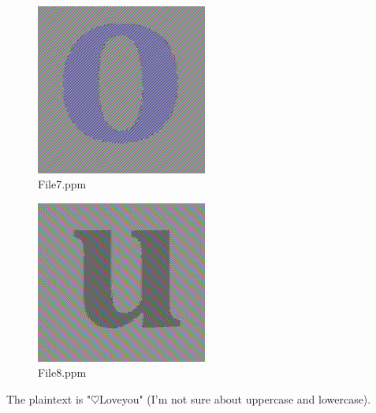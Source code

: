 \documentclass{article}
\begin{document}
\begin{figure}
    \centering
    \includegraphics[width=0.5\textwidth]{images/File7.png}
    \caption{File7.ppm}
\end{figure}

\begin{figure}
    \centering
    \includegraphics[width=0.5\textwidth]{images/File8.png}
    \caption{File8.ppm}
\end{figure}
The plaintext is "$\heartsuit$Loveyou" (I'm not sure about uppercase and lowercase).
\end{document}
